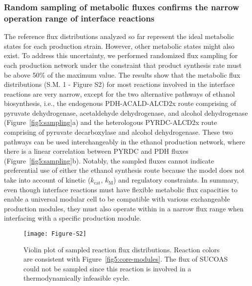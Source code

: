 \subsubsection*{Random sampling of metabolic fluxes confirms the narrow operation range of interface reactions}
The reference flux distributions analyzed so far represent the ideal metabolic states for each production strain. However, other metabolic states might also exist.
To address this uncertainty, we performed randomized flux sampling \citep{kaufman1998, heirendt2017} for each production network under the constraint that product synthesis rate must be above 50\% of the maximum value.
The results show that the metabolic flux distributions (S.M. 1 - Figure S2) for most reactions involved in the interface reactions are very narrow, except for the two alternative pathways of ethanol biosynthesis, i.e., the endogenous PDH-ACALD-ALCD2x route comprising of pyruvate dehydrogenase, acetaldehyde dehydrogenase, and alcohol dehydrogenase (Figure~\ref{fig5:sampling}a) and the heterologous PYRDC-ALCD2x route comprising of pyruvate decarboxylase and alcohol dehydrogenase. These two pathways can be used interchangeably in the ethanol production network, where there is a linear correlation between PYRDC and PDH fluxes (Figure~\ref{fig5:sampling}b). Notably, the sampled fluxes cannot indicate preferential use of either the ethanol synthesis route because the model does not take into account of kinetic ($k_{\textrm{cat}}$, $k_\textrm{M}$) and regulatory constraints.
In summary, even though interface reactions must have flexible metabolic flux capacities to enable a universal modular cell to be compatible with various exchangeable production modules, they must also operate within in a narrow flux range when interfacing with a specific production module.

\begin{figure}[!hp]
    \centering
    \texttt{[image: Figure-S2]}
    \caption[Violin plot of sampled reaction flux distributions]{
Violin plot of sampled reaction flux distributions. Reaction colors are consistent with Figure~\ref{fig5:core-modules}. The flux of SUCOAS could not be sampled since this reaction is involved in a thermodynamically infeasible cycle.
    }
    \label{fig5:fig-s2}
\end{figure}

